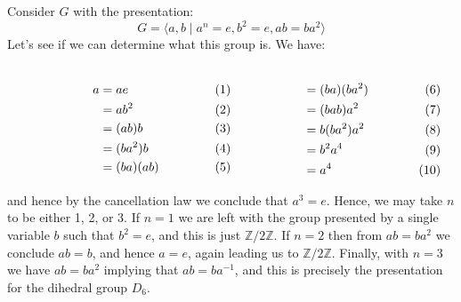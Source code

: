 \documentclass{article}                                                        %
\begin{document}
            \begin{example}
                Consider $G$ with the presentation:
                \begin{equation}
                    G=\langle{a},b\;|\;a^{n}=e,b^{2}=e,ab=ba^{2}\rangle
                \end{equation}
                Let's see if we can determine what this group is. We have:
                \par\vspace{-2.5ex}
                \begin{subequations}
                    \begin{minipage}[t]{0.49\textwidth}
                        \begin{align}
                            a&=ae\\
                            &=ab^{2}\\
                            &=(ab)b\\
                            &=(ba^{2})b\\
                            &=(ba)(ab)
                        \end{align}
                    \end{minipage}
                    \hfill
                    \begin{minipage}[t]{0.49\textwidth}
                        \begin{align}
                            &=(ba)(ba^{2})\\
                            &=(bab)a^{2}\\
                            &=b(ba^{2})a^{2}\\
                            &=b^{2}a^{4}\\
                            &=a^{4}
                        \end{align}
                    \end{minipage}
                \end{subequations}
                \par\vspace{2.5ex}
                and hence by the cancellation law we conclude that $a^{3}=e$.
                Hence, we may take $n$ to be either 1, 2, or 3. If $n=1$ we are
                left with the group presented by a single variable $b$ such that
                $b^{2}=e$, and this is just $\mathbb{Z}/2\mathbb{Z}$. If $n=2$
                then from $ab=ba^{2}$ we conclude $ab=b$, and hence $a=e$, again
                leading us to $\mathbb{Z}/2\mathbb{Z}$. Finally, with $n=3$ we
                have $ab=ba^{2}$ implying that $ab=ba^{\minus{1}}$, and this is
                precisely the presentation for the dihedral group $D_{6}$.
            \end{example}
\end{document}
